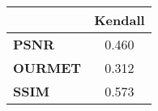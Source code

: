 \begin{tabular}{|l|c|}
\hline
&\textbf{Kendall}\\\hline
\textbf{PSNR}&0.460\\\hline
\textbf{OURMET}&0.312\\\hline
\textbf{SSIM}&0.573\\\hline
\end{tabular}
